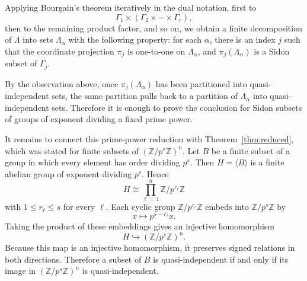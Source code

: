 \documentclass[11pt]{amsart}
\newcommand{\Z}{\mathbb{Z}}
\begin{document}
Applying Bourgain's theorem iteratively in the dual notation, first to
$$
\Gamma_1\times(\Gamma_2\times\cdots\times\Gamma_r),
$$
then to the remaining product factor, and so on, we obtain a finite decomposition of $\Lambda$ into sets $\Lambda_\alpha$ with the following property: for each $\alpha$, there is an index $j$ such that the coordinate projection $\pi_j$ is one-to-one on $\Lambda_\alpha$, and $\pi_j(\Lambda_\alpha)$ is a Sidon subset of $\Gamma_j$.

By the observation above, once $\pi_j(\Lambda_\alpha)$ has been partitioned into quasi-independent sets, the same partition pulls back to a partition of $\Lambda_\alpha$ into quasi-independent sets. Therefore it is enough to prove the conclusion for Sidon subsets of groups of exponent dividing a fixed prime power.

It remains to connect this prime-power reduction with Theorem~\ref{thm:reduced}, which was stated for finite subsets of $(\Z/p^s\Z)^n$. Let $B$ be a finite subset of a group in which every element has order dividing $p^s$. Then $H=\langle B\rangle$ is a finite abelian group of exponent dividing $p^s$. Hence
$$
H\cong \prod_{\ell=1}^n \Z/p^{r_\ell}\Z
$$
with $1\leq r_\ell\leq s$ for every $\ell$. Each cyclic group $\Z/p^{r_\ell}\Z$ embeds into $\Z/p^s\Z$ by
$$
x \mapsto p^{s-r_\ell}x.
$$
Taking the product of these embeddings gives an injective homomorphism
$$
H\hookrightarrow (\Z/p^s\Z)^n.
$$
Because this map is an injective homomorphism, it preserves signed relations in both directions. Therefore a subset of $B$ is quasi-independent if and only if its image in $(\Z/p^s\Z)^n$ is quasi-independent.
\end{document}
